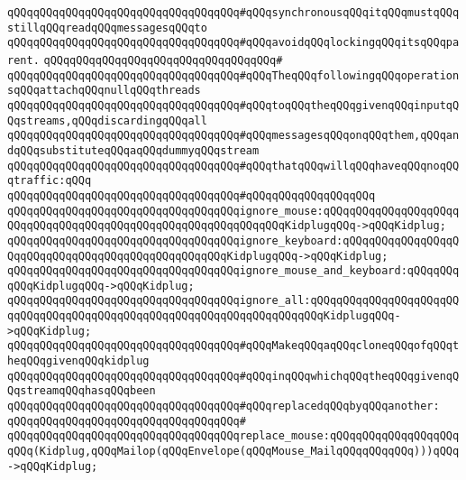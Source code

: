 \verb|qQQqqQQqqQQqqQQqqQQqqQQqqQQqqQQqqQQq#qQQqsynchronousqQQqitqQQqmustqQQqstillqQQqreadqQQqmessagesqQQqto|\newline
\verb|qQQqqQQqqQQqqQQqqQQqqQQqqQQqqQQqqQQq#qQQqavoidqQQqlockingqQQqitsqQQqparent.|\newline
\verb|qQQqqQQqqQQqqQQqqQQqqQQqqQQqqQQqqQQq#|\newline
\verb|qQQqqQQqqQQqqQQqqQQqqQQqqQQqqQQqqQQq#qQQqTheqQQqfollowingqQQqoperationsqQQqattachqQQqnullqQQqthreads|\newline
\verb|qQQqqQQqqQQqqQQqqQQqqQQqqQQqqQQqqQQq#qQQqtoqQQqtheqQQqgivenqQQqinputqQQqstreams,qQQqdiscardingqQQqall|\newline
\verb|qQQqqQQqqQQqqQQqqQQqqQQqqQQqqQQqqQQq#qQQqmessagesqQQqonqQQqthem,qQQqandqQQqsubstituteqQQqaqQQqdummyqQQqstream|\newline
\verb|qQQqqQQqqQQqqQQqqQQqqQQqqQQqqQQqqQQq#qQQqthatqQQqwillqQQqhaveqQQqnoqQQqtraffic:qQQq|\newline
\verb|qQQqqQQqqQQqqQQqqQQqqQQqqQQqqQQqqQQq#qQQqqQQqqQQqqQQqqQQq|\newline
\verb|qQQqqQQqqQQqqQQqqQQqqQQqqQQqqQQqqQQqignore_mouse:qQQqqQQqqQQqqQQqqQQqqQQqqQQqqQQqqQQqqQQqqQQqqQQqqQQqqQQqqQQqqQQqKidplugqQQq->qQQqKidplug;|\newline
\verb|qQQqqQQqqQQqqQQqqQQqqQQqqQQqqQQqqQQqignore_keyboard:qQQqqQQqqQQqqQQqqQQqqQQqqQQqqQQqqQQqqQQqqQQqqQQqqQQqKidplugqQQq->qQQqKidplug;|\newline
\verb|qQQqqQQqqQQqqQQqqQQqqQQqqQQqqQQqqQQqignore_mouse_and_keyboard:qQQqqQQqqQQqKidplugqQQq->qQQqKidplug;|\newline
\verb|qQQqqQQqqQQqqQQqqQQqqQQqqQQqqQQqqQQqignore_all:qQQqqQQqqQQqqQQqqQQqqQQqqQQqqQQqqQQqqQQqqQQqqQQqqQQqqQQqqQQqqQQqqQQqqQQqKidplugqQQq->qQQqKidplug;|\newline
\newline
\verb|qQQqqQQqqQQqqQQqqQQqqQQqqQQqqQQqqQQq#qQQqMakeqQQqaqQQqcloneqQQqofqQQqtheqQQqgivenqQQqkidplug|\newline
\verb|qQQqqQQqqQQqqQQqqQQqqQQqqQQqqQQqqQQq#qQQqinqQQqwhichqQQqtheqQQqgivenqQQqstreamqQQqhasqQQqbeen|\newline
\verb|qQQqqQQqqQQqqQQqqQQqqQQqqQQqqQQqqQQq#qQQqreplacedqQQqbyqQQqanother:|\newline
\verb|qQQqqQQqqQQqqQQqqQQqqQQqqQQqqQQqqQQq#|\newline
\verb|qQQqqQQqqQQqqQQqqQQqqQQqqQQqqQQqqQQqreplace_mouse:qQQqqQQqqQQqqQQqqQQqqQQq(Kidplug,qQQqMailop(qQQqEnvelope(qQQqMouse_MailqQQqqQQqqQQq)))qQQq->qQQqKidplug;|\newline
